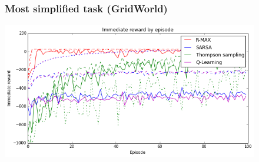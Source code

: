 \documentclass[10pt, compress]{beamer}
\begin{document}
\begin{frame}
\begin{figure}[ht]
  \frametitle{Most simplified task (GridWorld)}
  \vspace{3ex}
  \begin{center}
  \centerline{\includegraphics[width=1.1\textwidth]{img/mdp_imm_rewards.png}}
  \end{center}
  \end{figure}
\end{frame}

\end{document}
